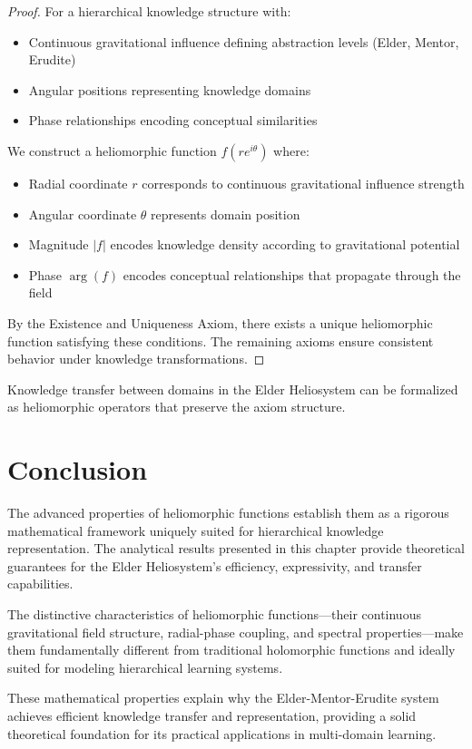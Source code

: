 \begin{proof}
For a hierarchical knowledge structure with:
\begin{itemize}
    \item Continuous gravitational influence defining abstraction levels (Elder, Mentor, Erudite)
    \item Angular positions representing knowledge domains
    \item Phase relationships encoding conceptual similarities
\end{itemize}

We construct a heliomorphic function $f(re^{i\theta})$ where:
\begin{itemize}
    \item Radial coordinate $r$ corresponds to continuous gravitational influence strength
    \item Angular coordinate $\theta$ represents domain position
    \item Magnitude $|f|$ encodes knowledge density according to gravitational potential
    \item Phase $\arg(f)$ encodes conceptual relationships that propagate through the field
\end{itemize}

By the Existence and Uniqueness Axiom, there exists a unique heliomorphic function satisfying these conditions. The remaining axioms ensure consistent behavior under knowledge transformations.
\end{proof}

\begin{corollary}
Knowledge transfer between domains in the Elder Heliosystem can be formalized as heliomorphic operators that preserve the axiom structure.
\end{corollary}

\section{Conclusion}

The advanced properties of heliomorphic functions establish them as a rigorous mathematical framework uniquely suited for hierarchical knowledge representation. The analytical results presented in this chapter provide theoretical guarantees for the Elder Heliosystem's efficiency, expressivity, and transfer capabilities.

The distinctive characteristics of heliomorphic functions—their continuous gravitational field structure, radial-phase coupling, and spectral properties—make them fundamentally different from traditional holomorphic functions and ideally suited for modeling hierarchical learning systems.

These mathematical properties explain why the Elder-Mentor-Erudite system achieves efficient knowledge transfer and representation, providing a solid theoretical foundation for its practical applications in multi-domain learning.